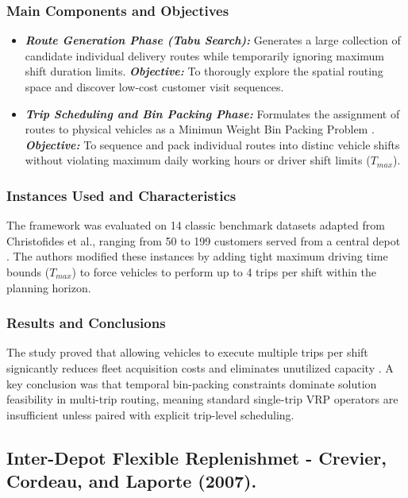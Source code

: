 \documentclass[conference]{IEEEtran}
\begin{document}
\subsubsection{Main Components and Objectives}
\begin{itemize}
    \item \textbf{\textit{Route Generation Phase (Tabu Search):}} Generates a large collection of candidate individual delivery routes while temporarily ignoring maximum shift duration limits. \textbf{\textit{Objective:}} To thorougly explore the spatial routing space and discover low-cost customer visit sequences.
    \item \textbf{\textit{Trip Scheduling and Bin Packing Phase:}} Formulates the assignment of routes to physical vehicles as a Minimun Weight Bin Packing Problem \cite{taillard1996vehicle}. \textbf{\textit{Objective:}} To sequence and pack individual routes into distinc vehicle shifts without violating maximum daily working hours or driver shift limits ($T_{max}$).
\end{itemize}

\subsubsection{Instances Used and Characteristics}
The framework was evaluated on 14 classic benchmark datasets adapted from Christofides et al., ranging from 50 to 199 customers served from a central depot \cite{taillard1996vehicle}. The authors modified these instances by adding tight maximum driving time bounds ($T_{max}$) to force vehicles to perform up to 4 trips per shift within the planning horizon.

\subsubsection{Results and Conclusions}
The study proved that allowing vehicles to execute multiple trips per shift signicantly reduces fleet acquisition costs and eliminates unutilized capacity \cite{taillard1996vehicle}. A key conclusion was that temporal bin-packing constraints dominate solution feasibility in multi-trip routing, meaning standard single-trip VRP operators are insufficient unless paired with explicit trip-level scheduling.

\subsection{Inter-Depot Flexible Replenishmet - Crevier, Cordeau, and Laporte (2007).}
\textit{\cite{crevier2007multi}}
\end{document}
